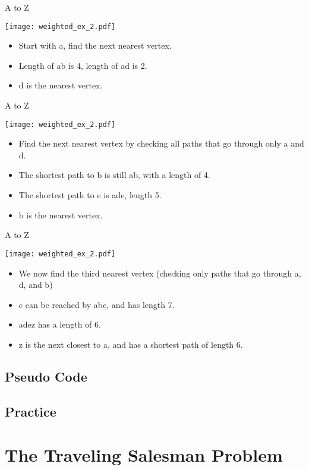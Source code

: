 \documentclass{beamer}
\begin{document}
\begin{frame}{A to Z}
	\centerline{\texttt{[image: weighted\_ex\_2.pdf]}}
	\begin{itemize}
	\item
		Start with a, find the next nearest vertex.
	\item
		Length of ab is 4, length of ad is 2.
	\item
		d is the nearest vertex.
	\end{itemize}
\end{frame}

\begin{frame}{A to Z}
	\centerline{\texttt{[image: weighted\_ex\_2.pdf]}}
	\begin{itemize}
	\item
		Find the next nearest vertex by checking all paths that go through only a and d.
	\item
		The shortest path to b is still ab, with a length of 4.
	\item
		The shortest path to e is ade, length 5.
	\item
		b is the nearest vertex.
	\end{itemize}
\end{frame}

\begin{frame}{A to Z}
	\centerline{\texttt{[image: weighted\_ex\_2.pdf]}}
	\begin{itemize}
	\item
		We now find the third nearest vertex (checking only paths that go through a, d, and b)
	\item
		c can be reached by abc, and has length 7.
	\item
		adez has a length of 6.
	\item
		z is the next closest to a, and has a shortest path of length 6.
	\end{itemize}
\end{frame}

\subsection{Pseudo Code}
\subsection{Practice}

\section{The Traveling Salesman Problem}
\end{document}
